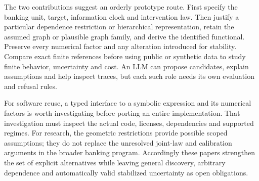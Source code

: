 The two contributions suggest an orderly prototype route. First specify
the banking unit, target, information clock and intervention law. Then
justify a particular dependence restriction or hierarchical representation,
retain the assumed graph or plausible graph family, and derive the
identified functional. Preserve every numerical factor and any alteration
introduced for stability. Compare exact finite references before using
public or synthetic data to study finite behavior, uncertainty and cost.
An LLM can propose candidates, explain assumptions and help inspect traces,
but each such role needs its own evaluation and refusal rules.

For software reuse, a typed interface to a symbolic expression and its
numerical factors is worth investigating before porting an entire
implementation. That investigation must inspect the actual code, licenses,
dependencies and supported regimes. For research, the geometric restrictions
provide possible scoped assumptions; they do not replace the unresolved
joint-law and calibration arguments in the broader banking program.
Accordingly these papers strengthen the set of explicit alternatives
while leaving general discovery, arbitrary dependence and automatically
valid stabilized uncertainty as open obligations.
